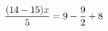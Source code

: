 \documentclass[preview]{standalone}
\begin{document}
\begin{align*}
\special{dvisvgm:raw <g id='unique000'>}\frac{(14 - 15) x}{5} = 9 - \frac{9}{2} + 8\special{dvisvgm:raw </g>}
\end{align*}
\end{document}
